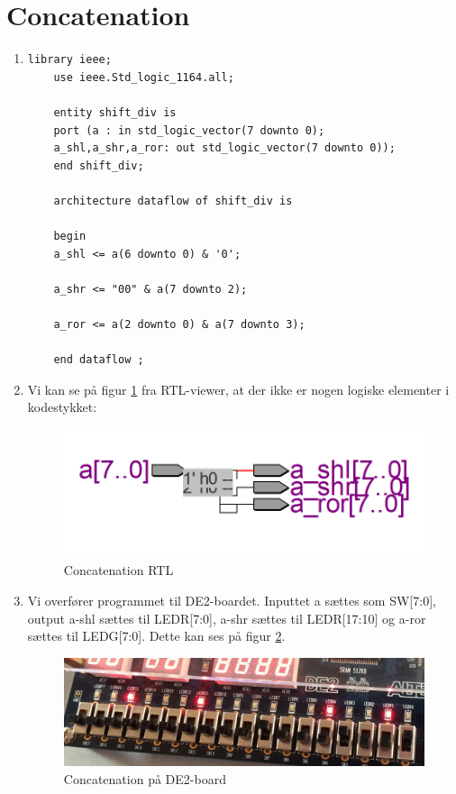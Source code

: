 \newpage
\section{Concatenation}
\begin{enumerate}
	\item[1)]
		\begin{lstlisting}[caption={Concatenation kode},label={lst:ConcatenationCode}]
	library ieee;
	use ieee.Std_logic_1164.all;
	
	entity shift_div is
	port (a : in std_logic_vector(7 downto 0);
	a_shl,a_shr,a_ror: out std_logic_vector(7 downto 0));
	end shift_div; 
	
	architecture dataflow of shift_div is
	
	begin 
	a_shl <= a(6 downto 0) & '0';
	
	a_shr <= "00" & a(7 downto 2);
	
	a_ror <= a(2 downto 0) & a(7 downto 3);
	
	end dataflow ;

		\end{lstlisting}
	\item[2)]
Vi kan se på figur \ref{fig:concatenationRTL} fra RTL-viewer, at der ikke er nogen logiske elementer i kodestykket:
	\begin{figure}[H]
		\centering
		\includegraphics[scale=0.5]{pictures/Oevelse3/Concatenation_RTL.png}
		\caption{Concatenation RTL}
		\label{fig:concatenationRTL}
	\end{figure}

	
	\item[3)]
Vi overfører programmet til DE2-boardet. Inputtet a sættes som SW[7:0], output a-shl sættes til LEDR[7:0], a-shr sættes til LEDR[17:10] og a-ror sættes til LEDG[7:0]. Dette kan ses på figur \ref{fig:concatenation_DE2board}.

	\begin{figure}[H]
		\centering
		\includegraphics[scale=0.23]{pictures/Oevelse3/Concatenation_DE2board.jpg}
		\caption{Concatenation på DE2-board}
		\label{fig:concatenation_DE2board}
	\end{figure}

\end{enumerate}